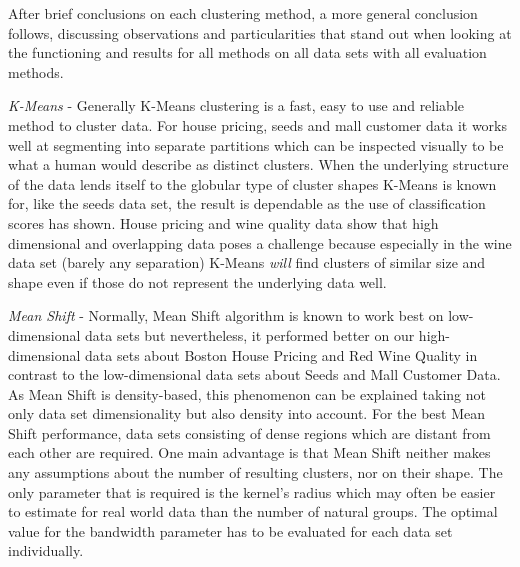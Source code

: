 
After brief conclusions on each clustering method, a more general conclusion follows, discussing observations and particularities that stand out when looking at the functioning and results for all methods on all data sets with all evaluation methods.

\textit{K-Means} - Generally K-Means clustering is a fast, easy to use and reliable method to cluster data. For house pricing, seeds and mall customer data it works well at segmenting into separate partitions which can be inspected visually to be what a human would describe as distinct clusters. When the underlying structure of the data lends itself to the globular type of cluster shapes K-Means is known for, like the seeds data set, the result is dependable as the use of classification scores has shown. House pricing and wine quality data show that high dimensional and overlapping data poses a challenge because especially in the wine data set (barely any separation) K-Means \textit{will} find clusters of similar size and shape even if those do not represent the underlying data well.

\textit{Mean Shift} - Normally, Mean Shift algorithm is known to work best on low-dimensional data sets but nevertheless, it performed better on our high-dimensional data sets about Boston House Pricing and Red Wine Quality in contrast to the low-dimensional data sets about Seeds and Mall Customer Data. As Mean Shift is density-based, this phenomenon can be explained taking not only data set dimensionality but also density into account. For the best Mean Shift performance, data sets consisting of dense regions which are distant from each other are required.
One main advantage is that Mean Shift neither makes any assumptions about the number of resulting clusters, nor on their shape. The only parameter that is required is the kernel's radius which may often be easier to estimate for real world data than the number of natural groups.
The optimal value for the bandwidth parameter has to be evaluated for each data set individually.


